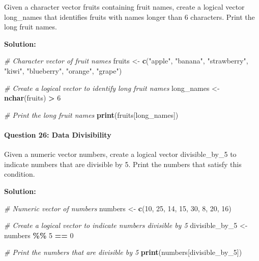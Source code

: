 \documentclass[
]{article}
\newenvironment{Shaded}{\begin{snugshade}}{\end{snugshade}}
\newcommand{\CommentTok}[1]{\textcolor[rgb]{0.56,0.35,0.01}{\textit{#1}}}
\newcommand{\DecValTok}[1]{\textcolor[rgb]{0.00,0.00,0.81}{#1}}
\newcommand{\FunctionTok}[1]{\textcolor[rgb]{0.13,0.29,0.53}{\textbf{#1}}}
\newcommand{\NormalTok}[1]{#1}
\newcommand{\OtherTok}[1]{\textcolor[rgb]{0.56,0.35,0.01}{#1}}
\newcommand{\SpecialCharTok}[1]{\textcolor[rgb]{0.81,0.36,0.00}{\textbf{#1}}}
\newcommand{\StringTok}[1]{\textcolor[rgb]{0.31,0.60,0.02}{#1}}
\begin{document}
Given a character vector fruits containing fruit names, create a logical
vector long\_names that identifies fruits with names longer than 6
characters. Print the long fruit names.

\textbf{Solution:}

\begin{Shaded}
\begin{Highlighting}[]
\CommentTok{\# Character vector of fruit names}
\NormalTok{fruits }\OtherTok{\textless{}{-}} \FunctionTok{c}\NormalTok{(}\StringTok{"apple"}\NormalTok{, }\StringTok{"banana"}\NormalTok{, }\StringTok{"strawberry"}\NormalTok{, }\StringTok{"kiwi"}\NormalTok{, }\StringTok{"blueberry"}\NormalTok{, }\StringTok{"orange"}\NormalTok{, }\StringTok{"grape"}\NormalTok{)}

\CommentTok{\# Create a logical vector to identify long fruit names}
\NormalTok{long\_names }\OtherTok{\textless{}{-}} \FunctionTok{nchar}\NormalTok{(fruits) }\SpecialCharTok{\textgreater{}} \DecValTok{6}

\CommentTok{\# Print the long fruit names}
\FunctionTok{print}\NormalTok{(fruits[long\_names])}
\end{Highlighting}
\end{Shaded}

\hypertarget{question-26-data-divisibility}{%
\paragraph{Question 26: Data
Divisibility}\label{question-26-data-divisibility}}

Given a numeric vector numbers, create a logical vector divisible\_by\_5
to indicate numbers that are divisible by 5. Print the numbers that
satisfy this condition.

\textbf{Solution:}

\begin{Shaded}
\begin{Highlighting}[]
\CommentTok{\# Numeric vector of numbers}
\NormalTok{numbers }\OtherTok{\textless{}{-}} \FunctionTok{c}\NormalTok{(}\DecValTok{10}\NormalTok{, }\DecValTok{25}\NormalTok{, }\DecValTok{14}\NormalTok{, }\DecValTok{15}\NormalTok{, }\DecValTok{30}\NormalTok{, }\DecValTok{8}\NormalTok{, }\DecValTok{20}\NormalTok{, }\DecValTok{16}\NormalTok{)}

\CommentTok{\# Create a logical vector to indicate numbers divisible by 5}
\NormalTok{divisible\_by\_5 }\OtherTok{\textless{}{-}}\NormalTok{ numbers }\SpecialCharTok{\%\%} \DecValTok{5} \SpecialCharTok{==} \DecValTok{0}

\CommentTok{\# Print the numbers that are divisible by 5}
\FunctionTok{print}\NormalTok{(numbers[divisible\_by\_5])}
\end{Highlighting}
\end{Shaded}
\end{document}
